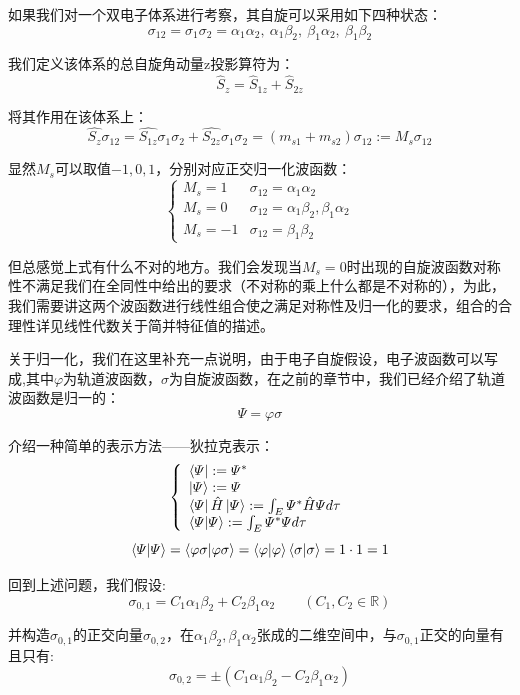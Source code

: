 如果我们对一个双电子体系进行考察，其自旋可以采用如下四种状态：
\[\sigma_{12}=\sigma_{1}\sigma_{2}=\alpha_1\alpha_2, \ \alpha_1\beta_2, \ \beta_1\alpha_2, \ \beta_1\beta_2\]

我们定义该体系的总自旋角动量z投影算符为：
\[\hat{S}_z=\hat{S}_{1z}+\hat{S}_{2z}\]

将其作用在该体系上：
\[\hat{S_z}\sigma_{12}=\hat{S_{1z}}\sigma_{1}\sigma_{2}+\hat{S_{2z}}\sigma_{1}\sigma_{2}=(m_{s1}+m_{s2})\sigma_{12}:=M_s\sigma_{12}\]

显然$M_s$可以取值$-1,0,1$，分别对应正交归一化波函数：
\[
    \left \{
    \begin{array}{ll}
        M_s=1  & \sigma_{12}=\alpha_1\alpha_2\\
        M_s=0  & \sigma_{12}=\alpha_1\beta_2,\beta_1\alpha_2\\
        M_s=-1 & \sigma_{12}=\beta_1\beta_2
    \end{array}
    \right .
\]

但总感觉上式有什么不对的地方。我们会发现当$M_s=0$时出现的自旋波函数对称性不满足我们在全同性中给出的要求（不对称的乘上什么都是不对称的），为此，我们需要讲这两个波函数进行线性组合使之满足对称性及归一化的要求，组合的合理性详见线性代数关于简并特征值的描述。

关于归一化，我们在这里补充一点说明，由于电子自旋假设，电子波函数可以写成,其中$\varphi$为轨道波函数，$\sigma$为自旋波函数，在之前的章节中，我们已经介绍了轨道波函数是归一的：
\[\varPsi=\varphi\sigma\]

介绍一种简单的表示方法——狄拉克表示：
\[
    \left \{
    \begin{array}{l}
        \bra{\varPsi}:=\varPsi^{*} \\
        \ket{\varPsi}:=\varPsi \\
        \bra{\varPsi}\hat{H}\ket{\varPsi}:=\int_E \varPsi^{*}\hat{H}\varPsi d\tau \\
        \bra{\varPsi}\ket{\varPsi}:=\int_E \varPsi^{*}\varPsi d\tau 
    \end{array} 
    \right .
\]
\[\bra{\varPsi}\ket{\varPsi}=\bra{\varphi\sigma}\ket{\varphi\sigma}=\bra{\varphi}\ket{\varphi}\bra{\sigma}\ket{\sigma}=1 \cdot 1=1\]

回到上述问题，我们假设:
\[\sigma_{0,1}=C_1\alpha_1\beta_2+C_2\beta_1\alpha_2 \qquad (C_1,C_2 \in \mathbb{R})\]

并构造$\sigma_{0,1}$的正交向量$\sigma_{0,2}$，在$\alpha_1\beta_2,\beta_1\alpha_2$张成的二维空间中，与$\sigma_{0,1}$正交的向量有且只有:
\[\sigma_{0,2}= \pm (C_1\alpha_1\beta_2-C_2\beta_1\alpha_2)\]

